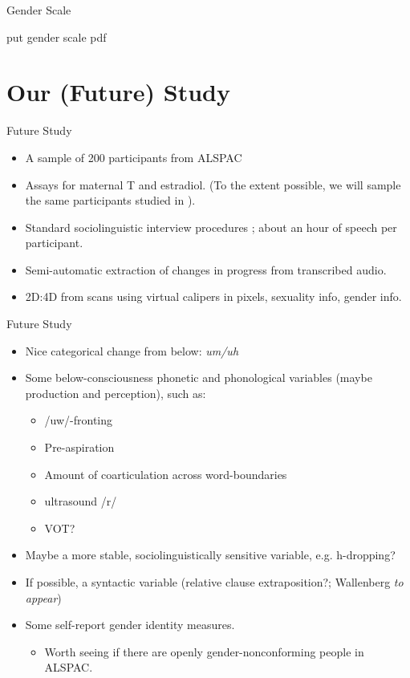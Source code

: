 \documentclass[hyperref={pdfpagelabels=false}]{beamer}
\begin{document}
\begin{frame}{Gender Scale}
\begin{center}
	put gender scale pdf
\end{center}
\end{frame}


\section{Our (Future) Study}

\begin{frame}{Future Study}
\begin{itemize}
	\item A sample of 200 participants from ALSPAC
	\item Assays for maternal T and estradiol. (To the extent possible, we will sample the same participants studied in \citealt{hinesetal2002}). 
	\item Standard sociolinguistic interview procedures \citep{tagliamonte2006}; about an hour of speech per participant.
	\item Semi-automatic extraction of changes in progress from transcribed audio.
	\item 2D:4D from scans using virtual calipers in pixels, sexuality info, gender info.
\end{itemize}
\end{frame}

\begin{frame}{Future Study}
\begin{itemize}
	
	\item Nice categorical change from below: \textsl{um/uh}
	\item Some below-consciousness phonetic and phonological variables (maybe production and perception), such as:
			\begin{itemize}
			\item /uw/-fronting
			\item Pre-aspiration
			\item Amount of coarticulation across word-boundaries
			\item ultrasound /r/
			\item VOT?
			
			\end{itemize}
	\item Maybe a more stable, sociolinguistically sensitive variable, e.g. h-dropping?
	\item If possible, a syntactic variable (relative clause extraposition?; Wallenberg \textsl{to appear})

	\item Some self-report gender identity measures.
		\begin{itemize}
			\item Worth seeing if there are openly gender-nonconforming people in ALSPAC.
		\end{itemize}
		\end{itemize}

\end{frame}
\end{document}
